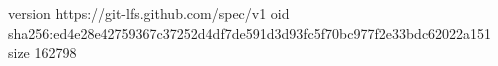version https://git-lfs.github.com/spec/v1
oid sha256:ed4e28e42759367c37252d4df7de591d3d93fc5f70bc977f2e33bdc62022a151
size 162798
